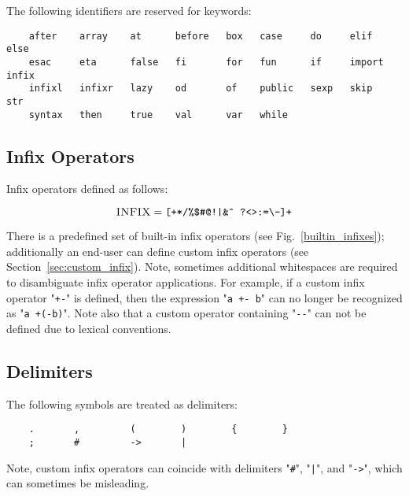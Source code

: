 The following identifiers are reserved for keywords:

\begin{lstlisting}
    after    array    at      before   box   case     do     elif     else
    esac     eta      false   fi       for   fun      if     import   infix
    infixl   infixr   lazy    od       of    public   sexp   skip     str
    syntax   then     true    val      var   while
\end{lstlisting}

\subsection{Infix Operators}

Infix operators defined as follows:

\[
\textsc{INFIX}=\mbox{\texttt{[+*/\%\$\#@!|\&\^{}~?<>:=\textbackslash-]+}}
\]

There is a predefined set of built-in infix operators (see Fig.~\ref{builtin_infixes}); additionally
an end-user can define custom infix operators (see Section~\ref{sec:custom_infix}). Note, sometimes 
additional whitespaces are required to disambiguate infix operator applications. For example, if a
custom infix operator "\lstinline|+-|" is defined, then the expression "\lstinline|a +- b|" can no longer be
recognized as "\lstinline|a +(-b)|". Note also that a custom operator containing "\lstinline|--|" can not be
defined due to lexical conventions.

\subsection{Delimiters}

The following symbols are treated as delimiters:

\begin{lstlisting}
    .       ,         (        )        {        }
    ;       #         ->       |
\end{lstlisting}

Note, custom infix operators can coincide with delimiters "\lstinline|#|", "\lstinline!|!", and "\lstinline|->|", which can
sometimes be misleading. 


